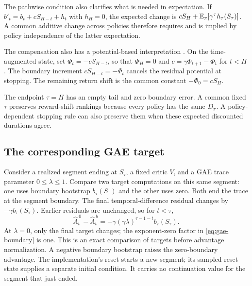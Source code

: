 The pathwise condition also clarifies what is needed in expectation. If $b'_t=b_t+cS_{H-t}+h_t$ with $h_H=0$, the expected change is $cS_H+\mathbb{E}_\pi[\gamma^\tau h_\tau(S_\tau)]$. A common additive change across policies therefore requires and is implied by policy independence of the latter expectation.

The compensation also has a potential-based interpretation \cite{ng}. On the time-augmented state, set $\Phi_t=-cS_{H-t}$, so that $\Phi_H=0$ and $c=\gamma\Phi_{t+1}-\Phi_t$ for $t<H$. The boundary increment $cS_{H-t}=-\Phi_t$ cancels the residual potential at stopping. The remaining return shift is the common constant $-\Phi_0=cS_H$.

The endpoint $\tau=H$ has an empty tail and zero boundary error. A common fixed $\tau$ preserves reward-shift rankings because every policy has the same $D_\pi$. A policy-dependent stopping rule can also preserve them when these expected discounted durations agree.

\subsection{The corresponding GAE target}

Consider a realized segment ending at $S_\tau$, a fixed critic $V$, and a GAE trace parameter $0\le\lambda\le1$. Compare two target computations on this same segment: one uses boundary bootstrap $b_\tau(S_\tau)$ and the other uses zero. Both end the trace at the segment boundary. The final temporal-difference residual changes by $-\gamma b_\tau(S_\tau)$. Earlier residuals are unchanged, so for $t<\tau$,
\begin{equation}
\widehat A_t^{\,0}-\widehat A_t^{\,b}
=-\gamma(\gamma\lambda)^{\tau-1-t}b_\tau(S_\tau).
\label{eq:gae-boundary}
\end{equation}
At $\lambda=0$, only the final target changes; the exponent-zero factor in \eqref{eq:gae-boundary} is one. This is an exact comparison of targets before advantage normalization. A negative boundary bootstrap raises the zero-boundary advantage. The implementation's reset starts a new segment; its sampled reset state supplies a separate initial condition. It carries no continuation value for the segment that just ended.

